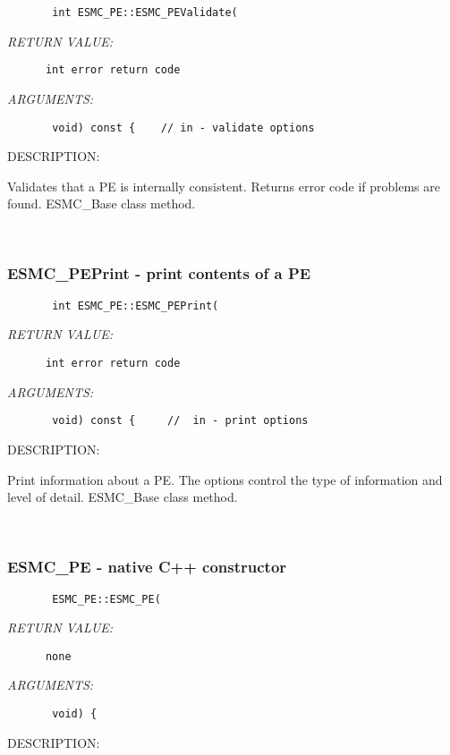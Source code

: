   
\begin{verbatim}       int ESMC_PE::ESMC_PEValidate(\end{verbatim}{\em RETURN VALUE:}
\begin{verbatim}      int error return code\end{verbatim}{\em ARGUMENTS:}
\begin{verbatim}       void) const {    // in - validate options\end{verbatim}
{\sf DESCRIPTION:\\ }


        Validates that a PE is internally consistent.
        Returns error code if problems are found.  ESMC\_Base class method.
   
 
\mbox{}\hrulefill\ 
 
\subsubsection{ESMC\_PEPrint - print contents of a PE}


  
\begin{verbatim}       int ESMC_PE::ESMC_PEPrint(\end{verbatim}{\em RETURN VALUE:}
\begin{verbatim}      int error return code\end{verbatim}{\em ARGUMENTS:}
\begin{verbatim}       void) const {     //  in - print options\end{verbatim}
{\sf DESCRIPTION:\\ }


        Print information about a PE.  The options control the
        type of information and level of detail.  ESMC\_Base class method.
   
 
\mbox{}\hrulefill\ 
 
\subsubsection{ESMC\_PE - native C++ constructor}


  
\begin{verbatim}       ESMC_PE::ESMC_PE(\end{verbatim}{\em RETURN VALUE:}
\begin{verbatim}      none\end{verbatim}{\em ARGUMENTS:}
\begin{verbatim}       void) {\end{verbatim}
{\sf DESCRIPTION:\\ }


